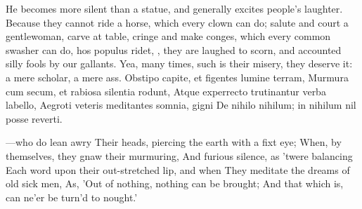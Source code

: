 {He becomes more silent than a statue, and generally excites people's
laughter. Because they cannot ride a horse, which every clown can do;
salute and court a gentlewoman, carve at table, cringe and make conges,
which every common swasher can do, hos populus ridet, \etc{}, they
are laughed to scorn, and accounted silly fools by our gallants. Yea,
many times, such is their misery, they deserve it: a mere
scholar, a mere ass.
Obstipo capite, et figentes lumine terram,
Murmura cum secum, et rabiosa silentia rodunt,
Atque experrecto trutinantur verba labello,
Aegroti veteris meditantes somnia, gigni
De nihilo nihilum; in nihilum nil posse reverti.

---who do lean awry
Their heads, piercing the earth with a fixt eye;
When, by themselves, they gnaw their murmuring,
And furious silence, as 'twere balancing
Each word upon their out-stretched lip, and when
They meditate the dreams of old sick men,
As, 'Out of nothing, nothing can be brought;
And that which is, can ne'er be turn'd to nought.'

}
